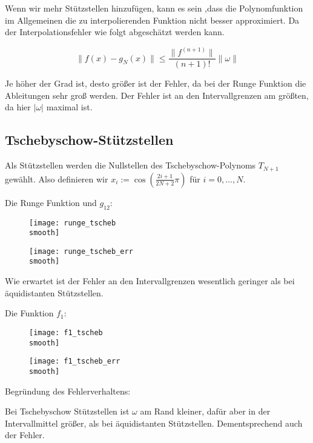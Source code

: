 \documentclass[]{scrartcl}
\begin{document}
	Wenn wir mehr Stützstellen hinzufügen, kann es sein ,dass die Polynomfunktion im Allgemeinen die zu interpolierenden Funktion nicht besser approximiert. Da der Interpolationsfehler wie folgt abgeschätzt werden kann.
	
	\[\lVert f(x)-g_N(x) \rVert\leq\frac{\lVert f^{(n+1)}\rVert}{(n+1)!}\lVert\omega\rVert\]
	
	Je höher der Grad ist, desto größer ist der Fehler, da bei der Runge Funktion die Ableitungen sehr groß werden. Der Fehler ist an den Intervallgrenzen am größten, da hier $|\omega|$ maximal ist. 
	
	\subsection{Tschebyschow-Stützstellen}
	Als Stützstellen werden die Nullstellen des Tschebyschow-Polynoms $T_{N+1}$ gewählt. Also definieren wir $x_i:=\cos(\frac{2i+1}{2N+2}\pi)$ für $i=0,\dots,N$.

	\newpage
	Die Runge Funktion und $g_{12}$:
	\begin{figure}[H]
		\centering
		\begin{minipage}{0.5\textwidth}
			\texttt{[image: runge\_tscheb\\smooth]}
			\caption{\label{Abb.3}}
		\end{minipage}
		\begin{minipage}{0.49\textwidth}
			\texttt{[image: runge\_tscheb\_err\\smooth]}
			\caption{\label{Abb.4}}
		\end{minipage}
	\end{figure}
	
	Wie erwartet ist der Fehler an den Intervallgrenzen wesentlich geringer als bei äquidistanten Stützstellen.
	
	Die Funktion $f_1$:
	\begin{figure}[H]
		\centering
		\begin{minipage}{0.5\textwidth}
			\texttt{[image: f1\_tscheb\\smooth]}
			\caption{}
		\end{minipage}
		\begin{minipage}{0.49\textwidth}
			\texttt{[image: f1\_tscheb\_err\\smooth]}
			\caption{}
		\end{minipage}
	\end{figure}
	
	Begründung des Fehlerverhaltens:
	
	Bei Tschebyschow Stützstellen ist $\omega$ am Rand kleiner, dafür aber in der Intervallmittel größer, als bei äquidistanten Stützstellen. Dementsprechend auch der Fehler.
	
\end{document}
